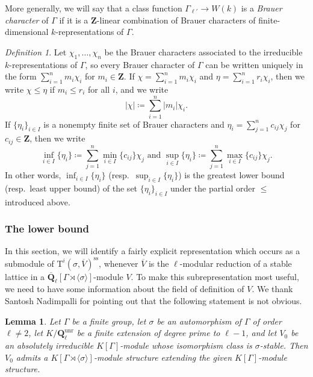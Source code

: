 \documentclass[reqno]{amsart}
\numberwithin{equation}{subsection}
\newcommand{\Q}{\mathbf{Q}}
\newcommand{\Z}{\mathbf{Z}}
\newcommand{\ol}[1]{\overline{#1}}
\DeclareMathOperator{\unr}{unr}
\newcommand{\rT}{\ensuremath{\mathrm{T}}\xspace}
\renewcommand{\ss}{\mathrm{ss}}
\newtheorem{lemma}[thm]{Lemma}
\theoremstyle{remark}
\newtheorem{defn}[thm]{Definition}
\numberwithin{equation}{subsection}
\numberwithin{figure}{subsection}
\begin{document}
More generally, we will say that a class function $\Gamma_{\ell'} \to W(k)$ is a \emph{Brauer character} of $\Gamma$ if it is a $\Z$-linear combination of Brauer characters of finite-dimensional $k$-representations of $\Gamma$. 

\begin{defn}
Let $\chi_1, \dots, \chi_n$ be the Brauer characters associated to the irreducible $k$-representations of $\Gamma$, so every Brauer character of $\Gamma$ can be written uniquely in the form $\sum_{i=1}^n m_i\chi_i$ for $m_i \in \Z$. If $\chi = \sum_{i=1}^n m_i\chi_i$ and $\eta = \sum_{i=1}^n r_i\chi_i$, then we write $\chi \leq \eta$ if $m_i \leq r_i$ for all $i$, and we write 
\[
|\chi| \coloneqq \sum_{i=1}^n |m_i|\chi_i.
\]
If $\{\eta_i\}_{i \in I}$ is a nonempty finite set of Brauer characters and $\eta_i = \sum_{j=1}^n c_{ij} \chi_j$ for $c_{ij} \in \Z$, then we write
\[
\inf_{i \in I}\{\eta_i\} \coloneqq \sum_{j=1}^n \min_{i \in I}\{c_{ij}\} \chi_j \text{ and } \sup_{i \in I}\{\eta_i\} \coloneqq \sum_{j=1}^n \max_{i \in I}\{c_{ij}\}\chi_j.
\]
In other words, $\inf_{i \in I}\{\eta_i\}$ (resp.\ $\sup_{i \in I}\{\eta_i\}$) is the greatest lower bound (resp.\ least upper bound) of the set $\{\eta_i\}_{i \in I}$ under the partial order $\leq$ introduced above.
\end{defn}

\subsubsection{The lower bound}

In this section, we will identify a fairly explicit representation which occurs as a submodule of $\rT^i(\sigma, \ol V)^{\ss}$, whenever $\ol V$ is the $\ell$-modular reduction of a stable lattice in a $\ol\Q_\ell[\Gamma \rtimes \langle\sigma\rangle]$-module $V$. To make this subrepresentation most useful, we need to have some information about the field of definition of $V$. We thank Santosh Nadimpalli for pointing out that the following statement is not obvious.

\begin{lemma}\label{lemma:stable-module-extension}
    Let $\Gamma$ be a finite group, let $\sigma$ be an automorphism of $\Gamma$ of order $\ell\neq 2$, let $K/\Q_\ell^{\unr}$ be a finite extension of degree prime to $\ell - 1$, and let $V_0$ be an absolutely irreducible $K[\Gamma]$-module whose isomorphism class is $\sigma$-stable. Then $V_0$ admits a $K[\Gamma \rtimes \langle\sigma\rangle]$-module structure extending the given $K[\Gamma]$-module structure.
\end{lemma}
\end{document}
